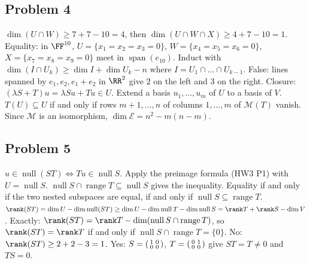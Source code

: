 \documentclass[11pt]{scrartcl}
\DeclareMathOperator{\nul}{null}
\DeclareMathOperator{\range}{range}
\DeclareMathOperator{\spn}{span}
\newcommand{\MM}{\mathcal M}
\begin{document}
\subsection*{Problem 4}
\begin{enumerate}[(a)]
  \ii $\dim(U\cap W)\ge7+7-10=4$, then $\dim(U\cap W\cap X)\ge4+7-10=1$.
  Equality: in $\FF^{10}$, $U=\{x_1=x_2=x_3=0\}$, $W=\{x_4=x_5=x_6=0\}$, $X=\{x_7=x_8=x_9=0\}$ meet in $\spn(e_{10})$.
  \ii Induct with $\dim(I\cap U_k)\ge\dim I+\dim U_k-n$ where $I=U_1\cap\dots\cap U_{k-1}$.
  \ii False: lines spanned by $e_1,e_2,e_1+e_2$ in $\RR^2$ give $2$ on the left and $3$ on the right.
  \ii Closure: $(\lambda S+T)u=\lambda Su+Tu\in U$.
  Extend a basis $u_1,\dots,u_m$ of $U$ to a basis of $V$.
  $T(U)\subseteq U$ if and only if rows $m+1,\dots,n$ of columns $1,\dots,m$ of $\MM(T)$ vanish.
  Since $\MM$ is an isomorphism, $\dim\mathcal E=n^2-m(n-m)$.
\end{enumerate}

\subsection*{Problem 5}
\begin{enumerate}[(a)]
  \ii $u\in\nul(ST)\iff Tu\in\nul S$. Apply the preimage formula (HW3 P1) with $U=\nul S$.
  \ii $\nul S\cap\range T\subseteq\nul S$ gives the inequality.
  Equality if and only if the two nested subspaces are equal, if and only if $\nul S\subseteq\range T$.
  \ii $\rank(ST)=\dim U-\dim\nul(ST)\ge\dim U-\dim\nul T-\dim\nul S=\rank T+\rank S-\dim V$.
  Exactly: $\rank(ST)=\rank T-\dim(\nul S\cap\range T)$, so $\rank(ST)=\rank T$ if and only if $\nul S\cap\range T=\{0\}$.
  \ii No: $\rank(ST)\ge2+2-3=1$.
  Yes: $S=\begin{psmallmatrix}1&0\\0&0\end{psmallmatrix}$, $T=\begin{psmallmatrix}0&1\\0&0\end{psmallmatrix}$ give $ST=T\ne0$ and $TS=0$.
\end{enumerate}
\end{document}
